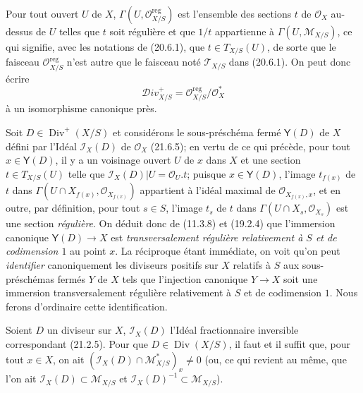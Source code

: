 Pour tout ouvert $U$ de $X$, $\Gamma(U,\mathcal O_{X/S}^{\mathrm{reg}})$ est
l'ensemble des sections $t$ de $\mathcal O_X$ au-dessus de $U$ telles que $t$ soit
régulière et que $1/t$ appartienne à $\Gamma(U,\mathscr M_{X/S})$, ce qui signifie,
avec les notations de (20.6.1), que $t\in T_{X/S}(U)$, de sorte que le faisceau
$\mathcal O_{X/S}^{\mathrm{reg}}$ n'est autre que le faisceau noté $\mathscr T_{X/S}$
dans (20.6.1). On peut donc écrire
\[
\label{IV.21.15.3.2}
  \mathscr{D}iv_{X/S}^+=\mathcal O_{X/S}^{\mathrm{reg}}/\mathcal O_X^*
  \tag{21.15.3.2}
\]
à un isomorphisme canonique près.

\begin{env}[21.15.3.3]
\label{IV.21.15.3.3}
Soit $D\in\operatorname{Div}^+(X/S)$ et considérons le sous-préschéma fermé $\boldsymbol{\mathsf{Y}}(D)$
de $X$ défini par l'Idéal $\mathscr I_X(D)$ de $\mathcal O_X$ (21.6.5); en vertu de
ce qui précède, pour tout $x\in\boldsymbol{\mathsf{Y}}(D)$, il y a un voisinage ouvert $U$ de $x$ dans $X$
et une section $t\in T_{X/S}(U)$ telle que
$\mathscr I_X(D)|U=\mathcal O_U.t$; puisque $x\in\boldsymbol{\mathsf{Y}}(D)$, l'image $t_{f(x)}$ de
$t$ dans $\Gamma(U\cap X_{f(x)},\mathcal O_{X_{f(x)}})$ appartient à l'idéal maximal
de $\mathcal O_{X_{f(x)},x}$, et en outre, par définition, pour tout $s\in S$, l'image
$t_s$ de $t$ dans $\Gamma(U\cap X_s,\mathcal O_{X_s})$ est une section
\emph{régulière}. On déduit donc de (11.3.8) et (19.2.4) que l'immersion canonique
$\boldsymbol{\mathsf{Y}}(D)\to X$ est \emph{transversalement régulière relativement à $S$ et de
codimension $1$} au point $x$. La réciproque étant immédiate, on voit qu'on peut
\emph{identifier} canoniquement les diviseurs positifs sur $X$ relatifs à $S$ aux
sous-préschémas fermés $Y$ de $X$ tels que l'injection canonique $Y\to X$ soit une
immersion transversalement régulière relativement à $S$ et de codimension $1$. Nous
ferons d'ordinaire cette identification.
\end{env}

\begin{proposition}[21.15.4]
\label{IV.21.15.4}
Soient $D$ un diviseur sur $X$, $\mathscr I_X(D)$ l'Idéal fractionnaire inversible
correspondant \textup{(21.2.5)}. Pour que $D\in\operatorname{Div}(X/S)$, il faut et il suffit
que, pour tout $x\in X$, on ait
$(\mathscr I_X(D)\cap\mathscr M_{X/S}^*)_x\ne0$ \textup{(}ou, ce qui revient au même, que
l'on ait $\mathscr I_X(D)\subset\mathscr M_{X/S}$ et
$\mathscr I_X(D)^{-1}\subset\mathscr M_{X/S}$\textup{)}.
\end{proposition}

